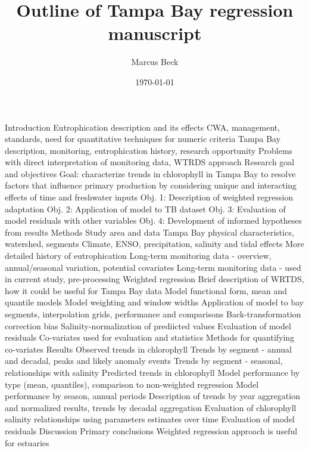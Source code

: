 \documentclass[letterpaper,12pt,oneside]{article}
\begin{document}
\title{Outline of Tampa Bay regression manuscript}
\author{Marcus Beck}
\date{\today}

\maketitle

\begin{outline}
\1 Introduction
\2 Eutrophication description and its effects
\2 CWA, management, standards, need for quantitative techniques for numeric criteria
\2 Tampa Bay description, monitoring, eutrophication history, research opportunity
\2 Problems with direct interpretation of monitoring data, WTRDS approach
\2 Research goal and objectives
\3 Goal: characterize trends in chlorophyll in Tampa Bay to resolve factors that influence primary production by considering unique and interacting effects of time and freshwater inputs
\3 Obj. 1: Description of weighted regression adaptation
\3 Obj. 2: Application of model to TB dataset
\3 Obj. 3: Evaluation of model residuals with other variables 
\3 Obj. 4: Development of informed hypotheses from results
\1 Methods
\2 Study area and data
\3 Tampa Bay physical characteristics, watershed, segments
\3 Climate, ENSO, precipitation, salinity and tidal effects
\3 More detailed history of eutrophication
\3 Long-term monitoring data - overview, annual/seasonal variation, potential covariates
\3 Long-term monitoring data - used in current study, pre-processing
\2 Weighted regression
\3 Brief description of WRTDS, how it could be useful for Tampa Bay data
\3 Model functional form, mean and quantile models
\3 Model weighting and window widths
\3 Application of model to bay segments, interpolation grids, performance and comparisons 
\3 Back-transformation correction bias
\3 Salinity-normalization of prediicted values
\2 Evaluation of model residuals
\2 Co-variates used for evaluation and statistics
\2 Methods for quantifying co-variates 
\1 Results
\2 Observed trends in chlorophyll 
\3 Trends by segment - annual and decadal, peaks and likely anomaly events
\3 Trends by segment - seasonal, relationships with salinity
\2 Predicted trends in chlorophyll
\3 Model performance by type (mean, quantiles), comparison to non-weighted regression
\3 Model performance by season, annual periods
\3 Description of trends by year aggregation and normalized results, trends by decadal aggregation
\3 Evaluation of chlorophyll salinity relationships using parameters estimates over time
\2 Evaluation of model residuals
\1 Discussion
\2 Primary conclusions
\3 Weighted regression approach is useful for estuaries

\end{outline}
\end{document}
